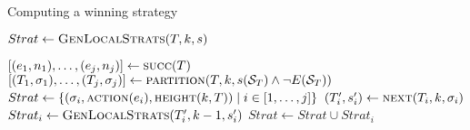 

\begin{algorithm}
   \caption{Computing a winning strategy}\label{alg:strat}
   \begin{algorithmic}[1]
            \State $Strat \gets \Call{GenLocalStrats}{T, k, s}$
            \State {}
        \EndFunction
        \Statex

            \State $[(e_1, n_1),\ldots,(e_j, n_j)] \gets \Call{succ}{T}$
            \State $[(T_1,\sigma_1),\ldots,(T_j, \sigma_j)] \gets \Call{partition}{T, k, s(\cS_T) \land \neg E(\cS_T)}$
            \State $Strat \gets \{(\sigma_i, \Call{action}{e_i}, \Call{height}{k, T}) \mid i \in[1,\ldots,j]\}$\label{alg:strat:strati}
            \label{alg:strat:for}
            \State $(T_i', s_i') \gets \Call{next}{T_i, k, \sigma_i}$\label{alg:strat:next}
                \State $Strat_i \gets \Call{GenLocalStrats}{T_i', k-1, s_i'}$\label{alg:strat:rec}
                \State $Strat \gets Strat \cup Strat_i$
            \EndFor\label{alg:strat:endfor}
            \State {} \label{alg:strat:return}
        \EndFunction
    \end{algorithmic}
\end{algorithm}


